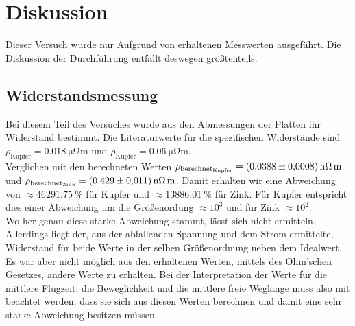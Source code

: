 \section{Diskussion}
Dieser Versuch wurde nur Aufgrund von erhaltenen Messwerten ausgeführt. Die Diskussion der Durchführung entfällt deswegen größtenteils.
\subsection{Widerstandsmessung}
Bei diesem Teil des Versuches wurde aus den Abmessungen der Platten ihr Widerstand bestimmt. Die Literaturwerte für die spezifischen Widerstände \cite{Widerstand}
sind $\rho_\text{Kupfer}=\SI{0.018}{\micro\ohm\metre}$ und $\rho_\text{Kupfer}=\SI{0.06}{\micro\ohm\metre}$.\\
Verglichen mit den berechneten Werten $\rho_\text{berechnet$_\text{Kupfer}$} = \SI{0.0388+-0.0008}{\nano\ohm\meter}$ und 
$\rho_\text{berechnet$_\text{Zink}$} = \SI{0.429+-0.011}{\nano\ohm\meter}$. Damit erhalten wir eine Abweichung von $\approx \SI{46291.75}{\percent}$ für Kupfer und 
$\approx \SI{13886.01}{\percent}$ für Zink. Für Kupfer entspricht dies einer Abweichung um die Größenordung $\approx 10^3$ und für Zink $\approx 10^2$.\\
Wo her genau diese starke Abweichung stammt, lässt sich nicht ermitteln.\\
Allerdings liegt der, aus der abfallenden Spannung und dem Strom ermittelte, Widerstand für beide Werte in der selben Größenordnung neben dem Idealwert.
Es war aber nicht möglich aus den erhaltenen Werten, mittels des Ohm'schen Gesetzes, andere Werte zu erhalten.  
Bei der Interpretation der Werte für die mittlere Flugzeit, die Beweglichkeit und die mittlere freie Weglänge muss also mit beachtet werden, dass sie sich aus diesen Werten berechnen und damit 
eine sehr starke Abweichung besitzen müssen.

